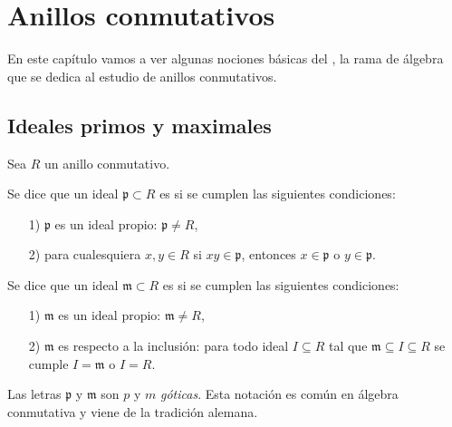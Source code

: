 \chapter{Anillos conmutativos}

En este capítulo vamos a ver algunas nociones básicas
del , la rama de álgebra que se dedica al estudio
de anillos conmutativos.


\section{Ideales primos y maximales}

\begin{definicion}
  \label{dfn:ideales-primos-y-maximales}
  Sea $R$ un anillo conmutativo.

  Se dice que un ideal $\mathfrak{p} \subset R$ es
   si se cumplen las siguientes condiciones:

  \begin{enumerate}
  \item[1)] $\mathfrak{p}$ es un ideal propio: $\mathfrak{p} \ne R$,

  \item[2)] para cualesquiera $x,y\in R$ si $xy \in \mathfrak{p}$, entonces
    $x \in \mathfrak{p}$ o $y \in \mathfrak{p}$.
  \end{enumerate}

  Se dice que un ideal $\mathfrak{m} \subset R$ es
   si se cumplen las siguientes condiciones:

  \begin{enumerate}
  \item[1)] $\mathfrak{m}$ es un ideal propio: $\mathfrak{m} \ne R$,

  \item[2)] $\mathfrak{m}$ es  respecto a la inclusión: para todo
    ideal $I \subseteq R$ tal que $\mathfrak{m} \subseteq I \subseteq R$ se
    cumple $I = \mathfrak{m}$ o $I = R$.
  \end{enumerate}
\end{definicion}

\begin{comentario}
  Las letras $\mathfrak{p}$ y $\mathfrak{m}$ son $p$ y $m$ \emph{góticas}. Esta
  notación es común en álgebra conmutativa y viene de la tradición alemana.
\end{comentario}


